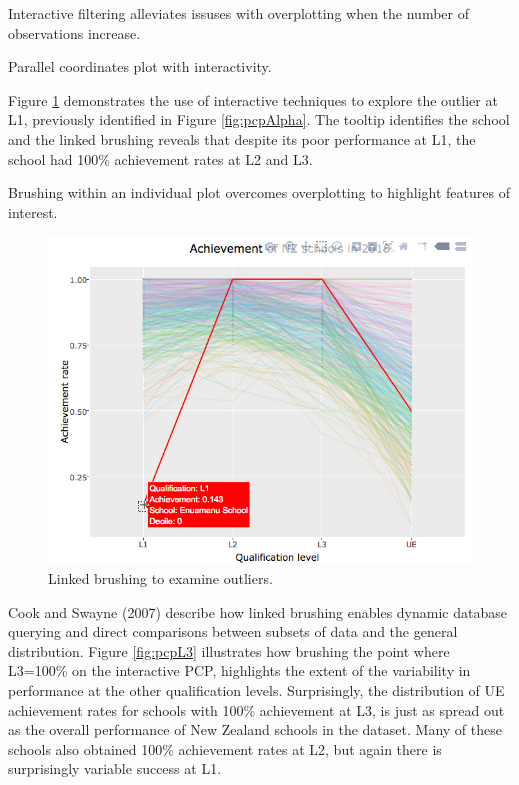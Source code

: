 \documentclass[]{book}
\theoremstyle{definition}
\theoremstyle{definition}
\theoremstyle{definition}
\theoremstyle{remark}
\begin{document}
\begin{boxed}
Interactive filtering alleviates issuses with overplotting when the
number of observations increase.
\end{boxed}

\hypertarget{4e075bed8bf0}{}

\label{fig:pcpInt}Parallel coordinates plot with interactivity.

Figure \ref{fig:pcpOut} demonstrates the use of interactive techniques
to explore the outlier at L1, previously identified in Figure
\ref{fig:pcpAlpha}. The tooltip identifies the school and the linked
brushing reveals that despite its poor performance at L1, the school had
100\% achievement rates at L2 and L3.

\begin{boxed}
Brushing within an individual plot overcomes overplotting to highlight
features of interest.
\end{boxed}

\begin{figure}[center]
\includegraphics[width=700px]{files/pcp_outlier} \caption{Linked brushing to examine outliers.}\label{fig:pcpOut}
\end{figure}

Cook and Swayne (2007) describe how linked brushing enables dynamic
database querying and direct comparisons between subsets of data and the
general distribution. Figure \ref{fig:pcpL3} illustrates how brushing
the point where L3=100\% on the interactive PCP, highlights the extent
of the variability in performance at the other qualification levels.
Surprisingly, the distribution of UE achievement rates for schools with
100\% achievement at L3, is just as spread out as the overall
performance of New Zealand schools in the dataset. Many of these schools
also obtained 100\% achievement rates at L2, but again there is
surprisingly variable success at L1.
\end{document}
